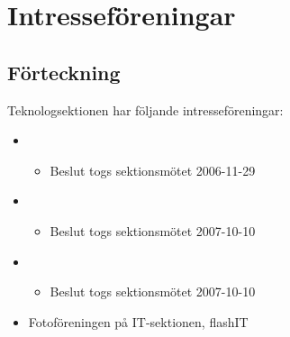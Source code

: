 \section{Intresseföreningar}

\subsection{Förteckning}

Teknologsektionen har följande intresseföreningar:

\begin{itemize}
	\item \EIGHTBITFULL{}
	\begin{itemize} 
		\item Beslut togs sektionsmötet 2006-11-29
	\end{itemize}
	\item \DRAWITFULL{}
	\begin{itemize} 
		\item Beslut togs sektionsmötet 2007-10-10
	\end{itemize}
	\item \HOOKITFULL{}
	\begin{itemize} 
		\item Beslut togs sektionsmötet 2007-10-10
	\end{itemize}
	\item Fotoföreningen på IT-sektionen, flashIT
\end{itemize}